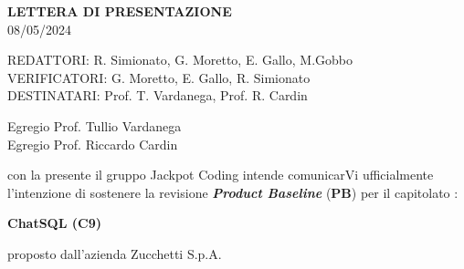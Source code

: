 \documentclass[5pt]{article}
\begin{document}
	\vspace{24pt}
	
	\begin{center}
		\textbf{\LARGE LETTERA DI PRESENTAZIONE}\\
		08/05/2024
	\end{center}
	
	\vspace{13pt}
	
	\begin{flushleft}
		\begin{spacing}{1.5}
			REDATTORI: R. Simionato, G. Moretto, E. Gallo, M.Gobbo\\%
			VERIFICATORI: G. Moretto, E. Gallo, R. Simionato\\
			\vspace{7pt}
			DESTINATARI: Prof. T. Vardanega, Prof. R. Cardin\\%
		\end{spacing}
	\end{flushleft}
	
	
	\restoregeometry	
	\pagebreak
	
\begin{flushleft}
	Egregio Prof. Tullio Vardanega\\
	Egregio Prof. Riccardo Cardin\\
\end{flushleft}

\begin{flushleft}
	con la presente il gruppo Jackpot Coding intende comunicarVi ufficialmente l'intenzione di sostenere la revisione \textbf{\textit{Product Baseline}} (\textbf{PB}) per il capitolato :
\end{flushleft}

\begin{center}
	\textbf{ChatSQL (C9)}
\end{center}
proposto dall'azienda Zucchetti S.p.A.\\
\end{document}
